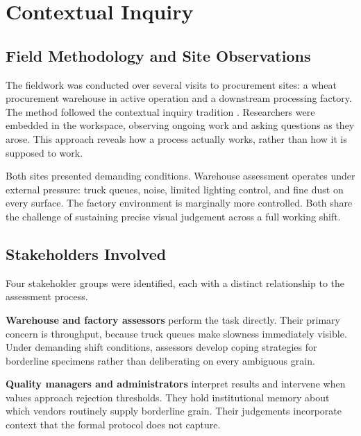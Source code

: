 
\chapter{Contextual Inquiry}\doublespacing
\label{Chapter2}

\section{Field Methodology and Site Observations}

The fieldwork was conducted over several visits to procurement sites: a wheat procurement warehouse in active operation and a downstream processing factory. The method followed the contextual inquiry tradition \cite{Holtzblatt1998}. Researchers were embedded in the workspace, observing ongoing work and asking questions as they arose. This approach reveals how a process actually works, rather than how it is supposed to work.

Both sites presented demanding conditions. Warehouse assessment operates under external pressure: truck queues, noise, limited lighting control, and fine dust on every surface. The factory environment is marginally more controlled. Both share the challenge of sustaining precise visual judgement across a full working shift.

\section{Stakeholders Involved}

Four stakeholder groups were identified, each with a distinct relationship to the assessment process.

\textbf{Warehouse and factory assessors} perform the task directly. Their primary concern is throughput, because truck queues make slowness immediately visible. Under demanding shift conditions, assessors develop coping strategies for borderline specimens rather than deliberating on every ambiguous grain.

\textbf{Quality managers and administrators} interpret results and intervene when values approach rejection thresholds. They hold institutional memory about which vendors routinely supply borderline grain. Their judgements incorporate context that the formal protocol does not capture.

